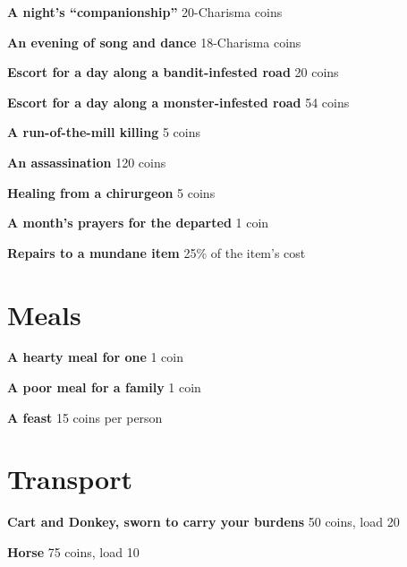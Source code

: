 {\noindent \bfseries A night's ``companionship''} \hspace*{\fill} 20-Charisma coins

{\noindent \bfseries An evening of song and dance} \hspace*{\fill} 18-Charisma coins

{\noindent \bfseries Escort for a day along a bandit-infested road} \hspace*{\fill} 20 coins

{\noindent \bfseries Escort for a day along a monster-infested road} \hspace*{\fill} 54 coins

{\noindent \bfseries A run-of-the-mill killing} \hspace*{\fill} 5 coins

{\noindent \bfseries An assassination} \hspace*{\fill} 120 coins

{\noindent \bfseries Healing from a chirurgeon} \hspace*{\fill} 5 coins

{\noindent \bfseries A month's prayers for the departed} \hspace*{\fill} 1 coin

{\noindent \bfseries Repairs to a mundane item} \hspace*{\fill} 25\% of the item's cost
\section*{Meals}

{\noindent \bfseries A hearty meal for one} \hspace*{\fill} 1 coin

{\noindent \bfseries A poor meal for a family} \hspace*{\fill} 1 coin

{\noindent \bfseries A feast} \hspace*{\fill} 15 coins per person
\section*{Transport}

{\noindent \bfseries Cart and Donkey, sworn to carry your burdens} \hspace*{\fill} 50 coins, load 20

{\noindent \bfseries Horse} \hspace*{\fill} 75 coins, load 10

